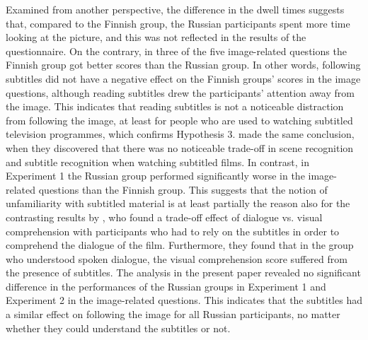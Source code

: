 \documentclass[output=paper]{langsci/langscibook}
\begin{document}
Examined from another perspective, the difference in the dwell times suggests that, compared to the Finnish group, the Russian participants spent more time looking at the picture, and this was not reflected in the results of the questionnaire. On the contrary, in three of the five image-related questions the Finnish group got better scores than the Russian group. In other words, following subtitles did not have a negative effect on the Finnish groups' scores in the image questions, although reading subtitles drew the participants' attention away from the image. This indicates that reading subtitles is not a noticeable distraction from following the image, at least for people who are used to watching subtitled television programmes, which confirms Hypothesis 3. \citet{Perego2010} made the same conclusion, when they discovered that there was no noticeable trade-off in scene recognition and subtitle recognition when watching subtitled films. In contrast, in Experiment 1 the Russian group performed significantly worse in the image-related questions than the Finnish group. This suggests that the notion of unfamiliarity with subtitled material is at least partially the reason also for the contrasting results by \citet{lavaur2011}, who found a trade-off effect of dialogue vs. visual comprehension with participants who had to rely on the subtitles in order to comprehend the dialogue of the film. Furthermore, they found that in the group who understood spoken dialogue, the visual comprehension score suffered from the presence of subtitles. The analysis in the present paper revealed no significant difference in the performances of the Russian groups in Experiment 1 and Experiment 2 in the image-related questions. This indicates that the subtitles had a similar effect on following the image for all Russian participants, no matter whether they could understand the subtitles or not.
\end{document}
